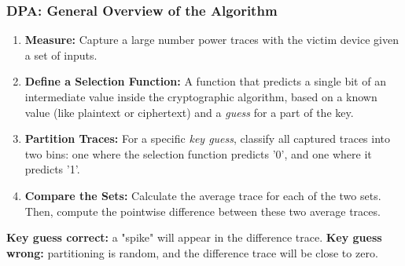 \begin{frame}
    \frametitle{DPA: General Overview of the Algorithm}    
    \begin{enumerate}
        \item \textbf{Measure:} Capture a large number power traces with the victim device given a set of inputs.
        \item \textbf{Define a Selection Function:} A function that predicts a single bit of an intermediate value inside the cryptographic algorithm, based on a known value (like plaintext or ciphertext) and a \textit{guess} for a part of the key.
        
        \item \textbf{Partition Traces:} For a specific \textit{key guess}, classify all captured traces into two bins: one where the selection function predicts '0', and one where it predicts '1'.
        
        \item \textbf{Compare the Sets:} Calculate the average trace for each of the two sets. Then, compute the pointwise difference between these two average traces.
    \end{enumerate}
    \begin{block}{}
        \textbf{Key guess correct:} a "spike" will appear in the difference trace. \newline 
        \textbf{Key guess wrong:} partitioning is random, and the difference trace will be close to zero.
    \end{block}
\end{frame}


